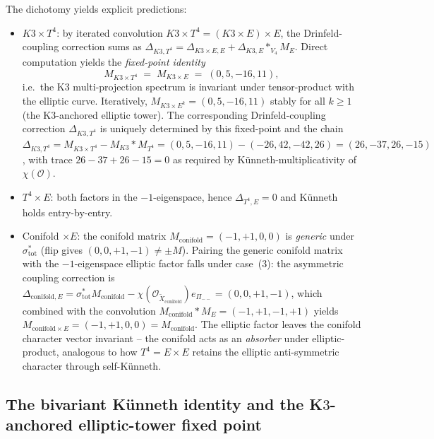 \begin{remark}[Predictions]
\label{rem:kunneth-dichotomy-predictions}
The dichotomy yields explicit predictions:
\begin{itemize}
\item $K3 \times T^4$: by iterated convolution
 $K3 \times T^4 = (K3 \times E) \times E$, the
 Drinfeld-coupling correction sums as
 $\Delta_{K3, T^4} = \Delta_{K3 \times E, E} + \Delta_{K3, E} *_{V_4} M_E$.
 Direct computation yields the
 \emph{fixed-point identity}
 \[
 M_{K3 \times T^4} \;=\; M_{K3 \times E} \;=\; (0, 5, -16, 11),
 \]
 i.e.\ the K$3$ multi-projection spectrum is invariant under
 tensor-product with the elliptic curve. Iteratively,
 $M_{K3 \times E^k} = (0, 5, -16, 11)$ stably for all $k \geq 1$
 (the K$3$-anchored elliptic tower). The corresponding
 Drinfeld-coupling correction $\Delta_{K3, T^4}$ is uniquely
 determined by this fixed-point and the chain
 $\Delta_{K3, T^4} = M_{K3 \times T^4} - M_{K3} * M_{T^4}
 = (0, 5, -16, 11) - (-26, 42, -42, 26) = (26, -37, 26, -15)$,
 with trace $26 - 37 + 26 - 15 = 0$ as required by Künneth-multiplicativity
 of $\chi(\mathcal{O})$.
\item $T^4 \times E$: both factors in the $-1$-eigenspace, hence
 $\Delta_{T^4, E} = 0$ and Künneth holds entry-by-entry.
\item Conifold $\times E$: the conifold matrix
 $M_{\mathrm{conifold}} = (-1, +1, 0, 0)$ is \emph{generic}
 under $\sigma_{\mathrm{tot}}^*$ \textup{(}flip gives
 $(0, 0, +1, -1) \neq \pm M$\textup{).} Pairing the generic
 conifold matrix with the $-1$-eigenspace elliptic factor falls
 under case~(3): the asymmetric coupling correction is
 $\Delta_{\mathrm{conifold}, E} = \sigma_{\mathrm{tot}}^* M_{\mathrm{conifold}}
 - \chi(\mathcal{O}_{\widetilde{X}_{\mathrm{conifold}}}) e_{\Pi_{--}}
 = (0, 0, +1, -1)$, which combined with the convolution
 $M_{\mathrm{conifold}} * M_E = (-1, +1, -1, +1)$ yields
 $M_{\mathrm{conifold} \times E} = (-1, +1, 0, 0)
 = M_{\mathrm{conifold}}$. The elliptic factor leaves the
 conifold character vector invariant -- the conifold acts as
 an \emph{absorber} under elliptic-product, analogous to how
 $T^4 = E \times E$ retains the elliptic anti-symmetric
 character through self-Künneth.
\end{itemize}
\end{remark}

\subsection{The bivariant Künneth identity and the K\texorpdfstring{$3$}{3}-anchored
 elliptic-tower fixed point}
\label{subsec:bivariant-kunneth-identity}

